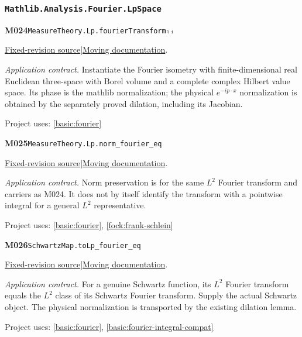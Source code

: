 \documentclass[11pt,a4paper]{article}
\theoremstyle{definition}
\theoremstyle{remark}
\begin{document}
\subsubsection*{\nolinkurl{Mathlib.Analysis.Fourier.LpSpace}}
\noindent\textbf{M024}\label{base:M024}\quad\nolinkurl{MeasureTheory.Lp.fourierTransformₗᵢ}

\href{https://github.com/leanprover-community/mathlib4/blob/9bac2d0692944a775113f7c130fd5e5b4608a854/Mathlib/Analysis/Fourier/LpSpace.lean}{Fixed-revision source}\quad|\quad\href{https://leanprover-community.github.io/mathlib4_docs/Mathlib/Analysis/Fourier/LpSpace.html#MeasureTheory.Lp.fourierTransformₗᵢ}{Moving documentation}.\par
\noindent\textit{Application contract.} Instantiate the Fourier isometry with finite-dimensional real Euclidean three-space with Borel volume and a complete complex Hilbert value space. Its phase is the mathlib normalization; the physical $e^{-ip\cdot x}$ normalization is obtained by the separately proved dilation, including its Jacobian.\par
{\small Project uses: \ref{basic:fourier}}\par\medskip

\noindent\textbf{M025}\label{base:M025}\quad\nolinkurl{MeasureTheory.Lp.norm_fourier_eq}

\href{https://github.com/leanprover-community/mathlib4/blob/9bac2d0692944a775113f7c130fd5e5b4608a854/Mathlib/Analysis/Fourier/LpSpace.lean}{Fixed-revision source}\quad|\quad\href{https://leanprover-community.github.io/mathlib4_docs/Mathlib/Analysis/Fourier/LpSpace.html#MeasureTheory.Lp.norm_fourier_eq}{Moving documentation}.\par
\noindent\textit{Application contract.} Norm preservation is for the same $L^2$ Fourier transform and carriers as M024. It does not by itself identify the transform with a pointwise integral for a general $L^2$ representative.\par
{\small Project uses: \ref{basic:fourier}, \ref{fock:frank-schlein}}\par\medskip

\noindent\textbf{M026}\label{base:M026}\quad\nolinkurl{SchwartzMap.toLp_fourier_eq}

\href{https://github.com/leanprover-community/mathlib4/blob/9bac2d0692944a775113f7c130fd5e5b4608a854/Mathlib/Analysis/Fourier/LpSpace.lean}{Fixed-revision source}\quad|\quad\href{https://leanprover-community.github.io/mathlib4_docs/Mathlib/Analysis/Fourier/LpSpace.html#SchwartzMap.toLp_fourier_eq}{Moving documentation}.\par
\noindent\textit{Application contract.} For a genuine Schwartz function, its $L^2$ Fourier transform equals the $L^2$ class of its Schwartz Fourier transform. Supply the actual Schwartz object. The physical normalization is transported by the existing dilation lemma.\par
{\small Project uses: \ref{basic:fourier}, \ref{basic:fourier-integral-compat}}\par\medskip
\end{document}
